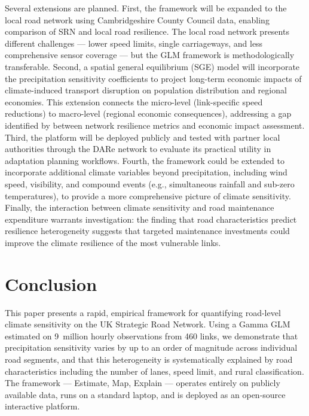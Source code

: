 \documentclass[review]{elsarticle}
\begin{document}
Several extensions are planned. First, the framework will be expanded to the local road network using Cambridgeshire County Council data, enabling comparison of SRN and local road resilience. The local road network presents different challenges --- lower speed limits, single carriageways, and less comprehensive sensor coverage --- but the GLM framework is methodologically transferable. Second, a spatial general equilibrium (SGE) model will incorporate the precipitation sensitivity coefficients to project long-term economic impacts of climate-induced transport disruption on population distribution and regional economies. This extension connects the micro-level (link-specific speed reductions) to macro-level (regional economic consequences), addressing a gap identified by \citet{ganin2017resilience} between network resilience metrics and economic impact assessment. Third, the platform will be deployed publicly and tested with partner local authorities through the DARe network to evaluate its practical utility in adaptation planning workflows. Fourth, the framework could be extended to incorporate additional climate variables beyond precipitation, including wind speed, visibility, and compound events (e.g., simultaneous rainfall and sub-zero temperatures), to provide a more comprehensive picture of climate sensitivity. Finally, the interaction between climate sensitivity and road maintenance expenditure warrants investigation: the finding that road characteristics predict resilience heterogeneity suggests that targeted maintenance investments could improve the climate resilience of the most vulnerable links.


\section{Conclusion}
\label{sec:conclusion}

This paper presents a rapid, empirical framework for quantifying road-level climate sensitivity on the UK Strategic Road Network. Using a Gamma GLM estimated on 9~million hourly observations from 460 links, we demonstrate that precipitation sensitivity varies by up to an order of magnitude across individual road segments, and that this heterogeneity is systematically explained by road characteristics including the number of lanes, speed limit, and rural classification. The framework --- Estimate, Map, Explain --- operates entirely on publicly available data, runs on a standard laptop, and is deployed as an open-source interactive platform.
\end{document}

